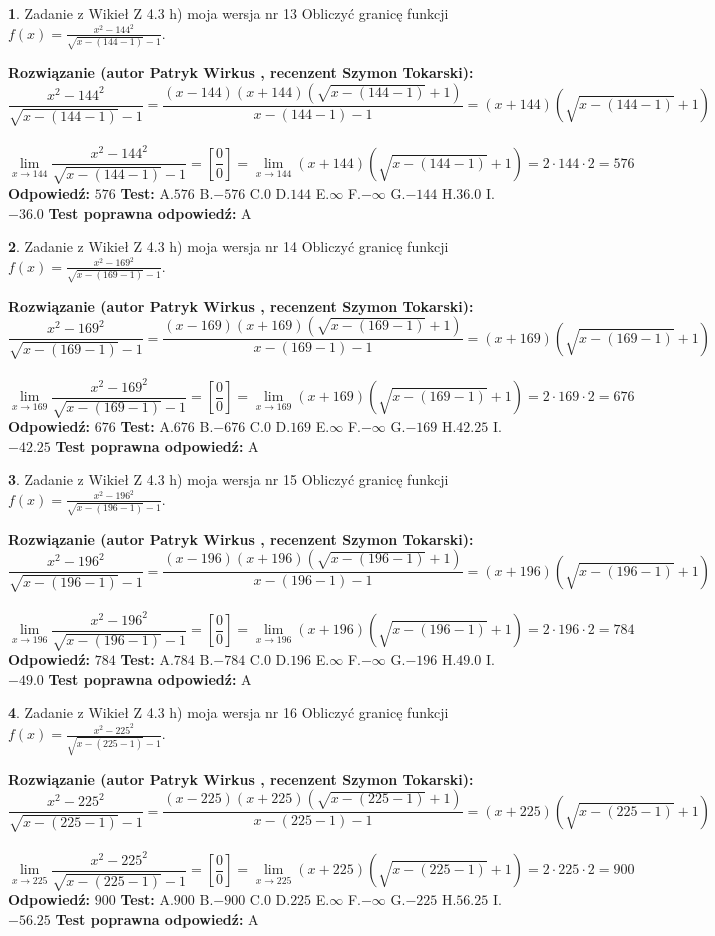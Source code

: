 \documentclass[12pt, a4paper]{article}
\theoremstyle{definition} %
\newtheorem{zad}{}
\newcommand{\zadStart}[1]{\begin{zad}#1\newline}
\newcommand{\zadStop}{\end{zad}}
\newcommand{\rozwStart}[2]{\noindent \textbf{Rozwiązanie (autor #1 , recenzent #2): }\newline}
\newcommand{\rozwStop}{\newline}
\newcommand{\odpStart}{\noindent \textbf{Odpowiedź:}\newline}
\newcommand{\odpStop}{\newline}
\newcommand{\testStart}{\noindent \textbf{Test:}\newline}
\newcommand{\testStop}{\newline}
\newcommand{\kluczStart}{\noindent \textbf{Test poprawna odpowiedź:}\newline}
\newcommand{\kluczStop}{\newline}
\begin{document}
\zadStart{Zadanie z Wikieł Z 4.3 h) moja wersja nr 13}
Obliczyć granicę funkcji $f(x)=\frac{x^{2} - 144^{2}}{\sqrt{x-(144-1)}-1}$.
\zadStop
\rozwStart{Patryk Wirkus}{Szymon Tokarski}
$$\frac{x^{2} - 144^{2}}{\sqrt{x-(144-1)}-1}=\frac{(x-144)(x+144)(\sqrt{x-(144-1)}+1)}{x-(144-1)-1}=(x+144)(\sqrt{x-(144-1)}+1)$$
\\
$$\lim\limits_{x\to 144}\frac{x^{2} - 144^{2}}{\sqrt{x-(144-1)}-1}=[\frac{0}{0}]=
\lim\limits_{x\to 144}(x+144)(\sqrt{x-(144-1)}+1) = 2\cdot144 \cdot 2 = 576$$
\rozwStop
\odpStart
$576$
\odpStop
\testStart
A.$576$
B.$-576$
C.$0$
D.$144$
E.$\infty$
F.$-\infty$
G.$-144$
H.$36.0$
I.$-36.0$
\testStop
\kluczStart
A
\kluczStop



\zadStart{Zadanie z Wikieł Z 4.3 h) moja wersja nr 14}
Obliczyć granicę funkcji $f(x)=\frac{x^{2} - 169^{2}}{\sqrt{x-(169-1)}-1}$.
\zadStop
\rozwStart{Patryk Wirkus}{Szymon Tokarski}
$$\frac{x^{2} - 169^{2}}{\sqrt{x-(169-1)}-1}=\frac{(x-169)(x+169)(\sqrt{x-(169-1)}+1)}{x-(169-1)-1}=(x+169)(\sqrt{x-(169-1)}+1)$$
\\
$$\lim\limits_{x\to 169}\frac{x^{2} - 169^{2}}{\sqrt{x-(169-1)}-1}=[\frac{0}{0}]=
\lim\limits_{x\to 169}(x+169)(\sqrt{x-(169-1)}+1) = 2\cdot169 \cdot 2 = 676$$
\rozwStop
\odpStart
$676$
\odpStop
\testStart
A.$676$
B.$-676$
C.$0$
D.$169$
E.$\infty$
F.$-\infty$
G.$-169$
H.$42.25$
I.$-42.25$
\testStop
\kluczStart
A
\kluczStop



\zadStart{Zadanie z Wikieł Z 4.3 h) moja wersja nr 15}
Obliczyć granicę funkcji $f(x)=\frac{x^{2} - 196^{2}}{\sqrt{x-(196-1)}-1}$.
\zadStop
\rozwStart{Patryk Wirkus}{Szymon Tokarski}
$$\frac{x^{2} - 196^{2}}{\sqrt{x-(196-1)}-1}=\frac{(x-196)(x+196)(\sqrt{x-(196-1)}+1)}{x-(196-1)-1}=(x+196)(\sqrt{x-(196-1)}+1)$$
\\
$$\lim\limits_{x\to 196}\frac{x^{2} - 196^{2}}{\sqrt{x-(196-1)}-1}=[\frac{0}{0}]=
\lim\limits_{x\to 196}(x+196)(\sqrt{x-(196-1)}+1) = 2\cdot196 \cdot 2 = 784$$
\rozwStop
\odpStart
$784$
\odpStop
\testStart
A.$784$
B.$-784$
C.$0$
D.$196$
E.$\infty$
F.$-\infty$
G.$-196$
H.$49.0$
I.$-49.0$
\testStop
\kluczStart
A
\kluczStop



\zadStart{Zadanie z Wikieł Z 4.3 h) moja wersja nr 16}
Obliczyć granicę funkcji $f(x)=\frac{x^{2} - 225^{2}}{\sqrt{x-(225-1)}-1}$.
\zadStop
\rozwStart{Patryk Wirkus}{Szymon Tokarski}
$$\frac{x^{2} - 225^{2}}{\sqrt{x-(225-1)}-1}=\frac{(x-225)(x+225)(\sqrt{x-(225-1)}+1)}{x-(225-1)-1}=(x+225)(\sqrt{x-(225-1)}+1)$$
\\
$$\lim\limits_{x\to 225}\frac{x^{2} - 225^{2}}{\sqrt{x-(225-1)}-1}=[\frac{0}{0}]=
\lim\limits_{x\to 225}(x+225)(\sqrt{x-(225-1)}+1) = 2\cdot225 \cdot 2 = 900$$
\rozwStop
\odpStart
$900$
\odpStop
\testStart
A.$900$
B.$-900$
C.$0$
D.$225$
E.$\infty$
F.$-\infty$
G.$-225$
H.$56.25$
I.$-56.25$
\testStop
\kluczStart
A
\kluczStop
\end{document}
